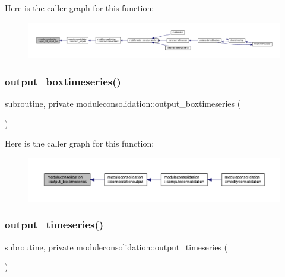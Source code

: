 Here is the caller graph for this function\+:\nopagebreak
\begin{figure}[H]
\begin{center}
\leavevmode
\includegraphics[width=350pt]{namespacemoduleconsolidation_a815002368bde1f9440c793d1c3f03f37_icgraph}
\end{center}
\end{figure}
\mbox{\label{namespacemoduleconsolidation_a18a3f871c1e0bfbadc4c99e69e5216ec}} 
\subsubsection{\texorpdfstring{output\+\_\+boxtimeseries()}{output\_boxtimeseries()}}
{\footnotesize\ttfamily subroutine, private moduleconsolidation\+::output\+\_\+boxtimeseries (\begin{DoxyParamCaption}{ }\end{DoxyParamCaption})\hspace{0.3cm}{\ttfamily [private]}}

Here is the caller graph for this function\+:\nopagebreak
\begin{figure}[H]
\begin{center}
\leavevmode
\includegraphics[width=350pt]{namespacemoduleconsolidation_a18a3f871c1e0bfbadc4c99e69e5216ec_icgraph}
\end{center}
\end{figure}
\mbox{\label{namespacemoduleconsolidation_aaca2f5ea993ad6f34b1699f8fccfe168}} 
\subsubsection{\texorpdfstring{output\+\_\+timeseries()}{output\_timeseries()}}
{\footnotesize\ttfamily subroutine, private moduleconsolidation\+::output\+\_\+timeseries (\begin{DoxyParamCaption}{ }\end{DoxyParamCaption})\hspace{0.3cm}{\ttfamily [private]}}

